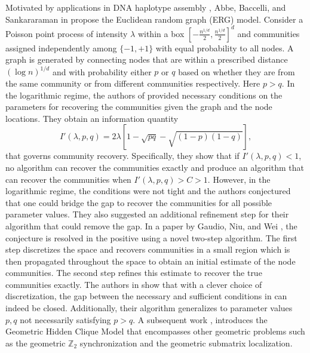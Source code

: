 \documentclass[letterpaper,11pt]{article}
\theoremstyle{definition}
\def\Z{\mathbb{Z}}
\numberwithin{equation}{section}
\newcommand{\la}{\lambda}
\theoremstyle{definition}
\def\Z{\mathbb{Z}}
\numberwithin{equation}{section}
\newcommand{\la}{\lambda}
\theoremstyle{thmstyletwo}%
\begin{document}
Motivated by applications in DNA haplotype assembly \cite{sankararaman2020comhapdet}, Abbe, Baccelli, and Sankararaman in \cite{abbe2021community} propose the Euclidean random graph (ERG) model. Consider a Poisson point process of intensity $\la$ within a box  $\left[-\frac{n^{1/d}}{2},\frac{n^{1/d}}{2}\right]^d $ and communities assigned independently among $\{-1,+1\}$ with equal probability to all nodes. A graph is generated by connecting nodes that are within a prescribed distance $(\log n)^{1/d}$ and with probability either $p$ or $q$ based on whether they are from the same community or from different communities respectively. Here $p>q$. In the logarithmic regime, the authors of \cite{abbe2021community} provided necessary conditions on the parameters for recovering the communities given the graph and the node locations.  They obtain an information quantity 
\begin{equation}
I'(\la,p,q) = 2\la \left[1-\sqrt{pq}-\sqrt{(1-p)(1-q)}\right],
\label{eq:abs_info}
\end{equation}
that governs community recovery. Specifically, they show that if $I'(\la,p,q)<1$, no algorithm can recover the communities exactly and produce an algorithm that can recover the communities when $I'(\la,p,q)>C>1$. However, in the logarithmic regime, the conditions were not tight and the authors conjectured that one could bridge the gap to recover the communities for all possible parameter values. They also suggested an additional refinement step for their algorithm that could remove the gap. In a paper by Gaudio, Niu, and Wei \cite{gaudio2024exact}, the conjecture is resolved in the positive using a novel two-step algorithm. The first step discretizes the space and recovers communities in a small region which is then propagated throughout the space to obtain an initial estimate of the node communities. The second step refines this estimate to recover the true communities exactly. The authors in \cite{gaudio2024exact} show that with a clever choice of discretization, the gap between the necessary and sufficient conditions in \cite{abbe2021community} can indeed be closed. Additionally, their algorithm generalizes to parameter values $p,q$ not necessarily satisfying $p>q$. A subsequent work \cite{gaudio2024exactERG}, introduces the Geometric Hidden Clique Model that encompasses other geometric problems such as the geometric $\Z_2$ synchronization and the geometric submatrix localization.
\end{document}
